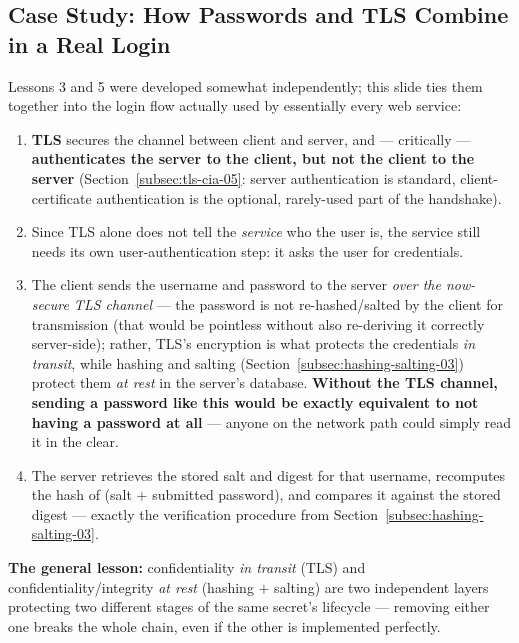 \documentclass[12pt, a4paper]{article}
\begin{document}
\subsection{Case Study: How Passwords and TLS Combine in a Real Login}
\label{subsec:login-flow-06}
Lessons 3 and 5 were developed somewhat independently; this slide ties them together into the login flow actually used by essentially every web service:
\begin{enumerate}
    \item \textbf{TLS} secures the channel between client and server, and --- critically --- \textbf{authenticates the server to the client, but not the client to the server} (Section~\ref{subsec:tls-cia-05}: server authentication is standard, client-certificate authentication is the optional, rarely-used part of the handshake).
    \item Since TLS alone does not tell the \emph{service} who the user is, the service still needs its own user-authentication step: it asks the user for credentials.
    \item The client sends the username and password to the server \emph{over the now-secure TLS channel} --- the password is not re-hashed/salted by the client for transmission (that would be pointless without also re-deriving it correctly server-side); rather, TLS's encryption is what protects the credentials \emph{in transit}, while hashing and salting (Section~\ref{subsec:hashing-salting-03}) protect them \emph{at rest} in the server's database. \textcolor{red!70!black}{\textbf{Without the TLS channel, sending a password like this would be exactly equivalent to not having a password at all}} --- anyone on the network path could simply read it in the clear.
    \item The server retrieves the stored salt and digest for that username, recomputes the hash of (salt $+$ submitted password), and compares it against the stored digest --- exactly the verification procedure from Section~\ref{subsec:hashing-salting-03}.
\end{enumerate}
\textcolor{blue!50!black}{\textbf{The general lesson:}} confidentiality \emph{in transit} (TLS) and confidentiality/integrity \emph{at rest} (hashing $+$ salting) are two independent layers protecting two different stages of the same secret's lifecycle --- removing either one breaks the whole chain, even if the other is implemented perfectly.
\end{document}

